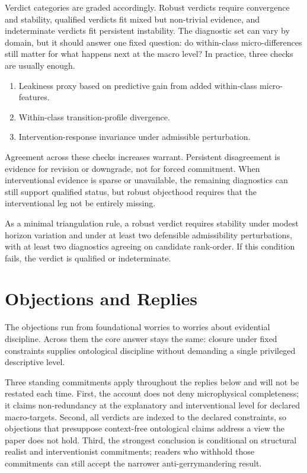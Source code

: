 Verdict categories are graded accordingly. Robust verdicts require
convergence and stability, qualified verdicts fit mixed but non-trivial
evidence, and indeterminate verdicts fit persistent instability. The
diagnostic set can vary by domain, but it should answer one fixed
question: do within-class micro-differences still matter for what
happens next at the macro level? In practice, three checks are usually enough.

\begin{enumerate}
	\item
	      Leakiness proxy based on predictive gain from added within-class
	      micro-features.
	\item
	      Within-class transition-profile divergence.
	\item
	      Intervention-response invariance under admissible perturbation.
\end{enumerate}

Agreement across these checks increases warrant. Persistent disagreement
is evidence for revision or downgrade, not for forced commitment. When
interventional evidence is sparse or unavailable, the remaining
diagnostics can still support qualified status, but robust objecthood
requires that the interventional leg not be entirely missing.

As a minimal triangulation rule, a robust verdict requires stability
under modest horizon variation and under at least two defensible
admissibility perturbations, with at least two diagnostics agreeing on
candidate rank-order. If this condition fails, the verdict is qualified
or indeterminate.

\section{Objections and Replies}\label{objections-and-replies}

The objections run from foundational worries to worries about
evidential discipline. Across them the core answer stays the same:
closure under fixed constraints supplies ontological discipline without
demanding a single privileged descriptive level.

Three standing commitments apply throughout the replies below and will
not be restated each time. First, the account does not deny
microphysical completeness; it claims non-redundancy at the explanatory
and interventional level for declared macro-targets. Second, all
verdicts are indexed to the declared constraints, so objections that
presuppose context-free ontological claims address a view the paper does
not hold. Third, the strongest conclusion is conditional on structural
realist and interventionist commitments; readers who withhold those
commitments can still accept the narrower anti-gerrymandering result.

